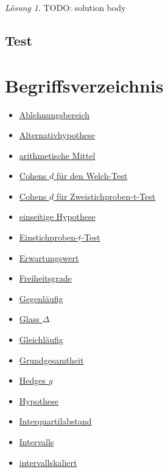 \documentclass[
]{book}
\providecommand{\tightlist}{%
  \setlength{\itemsep}{0pt}\setlength{\parskip}{0pt}}
\theoremstyle{definition}
\theoremstyle{definition}
\theoremstyle{definition}
\theoremstyle{definition}
\theoremstyle{remark}
\newtheorem*{solution}{Lösung}
\begin{document}
\begin{solution}
TODO: solution body
\end{solution}

\section{Test}\label{test-4}

\chapter*{Begriffsverzeichnis}\label{begriffsverzeichnis}

\begin{itemize}
\tightlist
\item
  \hyperref[customdef-ablehnungsbereich]{Ablehnungsbereich}
\item
  \hyperref[customdef-alternativhypothese]{Alternativhypothese}
\item
  \hyperref[customdef-arithmetisches-mittel]{arithmetische Mittel}
\item
  \hyperref[customdef-welch-cohens-d]{Cohens \(d\) für den Welch-Test}
\item
  \hyperref[customdef-cohens-d]{Cohens \(d\) für Zweistichproben-t-Test}
\item
  \hyperref[customdef-einseitige-hypothese]{einseitige Hypothese}
\item
  \hyperref[customdef-t-test]{Einstichproben-\(t\)-Test}
\item
  \hyperref[customdef-erwartungswert]{Erwartungswert}
\item
  \hyperref[customdef-freiheitsgrade]{Freiheitsgrade}
\item
  \hyperref[customdef-gegenlaeufig]{Gegenläufig}
\item
  \hyperref[customdef-glass-delta]{Glass \(\Delta\)}
\item
  \hyperref[customdef-gleichlaeufig]{Gleichläufig}
\item
  \hyperref[customdef-grundgesamtheit]{Grundgesamtheit}
\item
  \hyperref[customdef-hedges-g]{Hedges \(g\)}
\item
  \hyperref[customdef-hypothese]{Hypothese}
\item
  \hyperref[customdef-iqr]{Interquartilabstand}
\item
  \hyperref[customdef-interval]{Intervalls}
\item
  \hyperref[customdef-intervallskaliert]{intervallskaliert}

\end{itemize}
\end{document}
